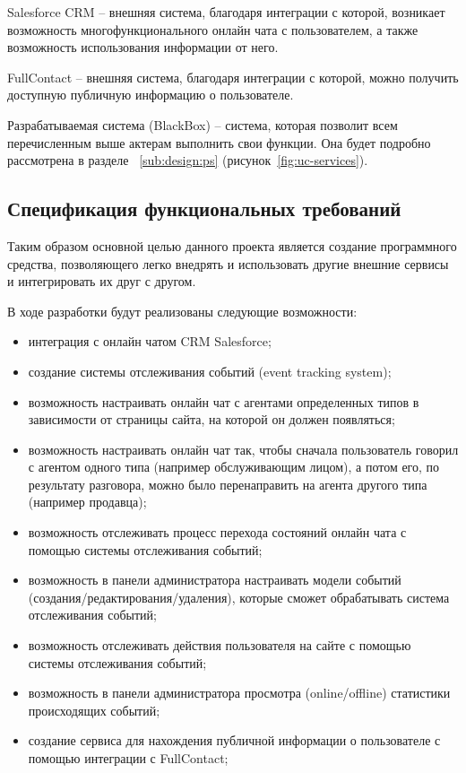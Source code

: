 Salesforce CRM -- внешняя система, благодаря интеграции с которой, возникает возможность многофункционального онлайн чата с пользователем, а также возможность использования информации от него.

FullContact -- внешняя система, благодаря интеграции с которой, можно получить доступную публичную информацию о пользователе.

Разрабатываемая система (BlackBox) -- система, которая позволит всем перечисленным выше актерам выполнить свои функции. Она будет подробно рассмотрена в разделе ~\ref{sub:design:ps}  (рисунок~\ref{fig:uc-services}).


\subsection{Спецификация функциональных требований}
\label{sub:models:func_req}

Таким образом основной целью данного проекта является создание программного средства, позволяющего легко внедрять и использовать другие внешние сервисы и интегрировать их друг с другом.

В ходе разработки будут реализованы следующие возможности:
\begin{itemize}
\item интеграция с онлайн чатом CRM Salesforce;
\item создание системы отслеживания событий (event tracking system);
\item возможность настраивать онлайн чат с агентами определенных типов в зависимости от страницы сайта, на которой он должен появляться;
\item возможность настраивать онлайн чат так, чтобы сначала пользователь говорил с агентом одного типа (например обслуживающим лицом), а потом его, по результату разговора, можно было перенаправить на агента другого типа (например продавца);
\item возможность отслеживать процесс перехода состояний онлайн чата с помощью системы отслеживания событий;
\item возможность в панели администратора настраивать модели событий (создания/редактирования/удаления), которые сможет обрабатывать система отслеживания событий; 
\item возможность отслеживать действия пользователя на сайте с помощью системы отслеживания событий;
\item возможность в панели администратора просмотра (online/offline) статистики происходящих событий;
\item создание сервиса для нахождения публичной информации о пользователе с помощью интеграции с FullContact;
\end{itemize}

